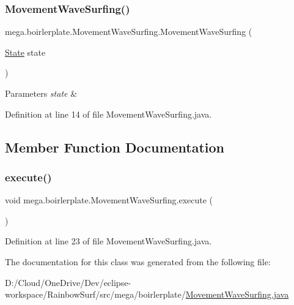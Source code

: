 \subsubsection{\texorpdfstring{Movement\+Wave\+Surfing()}{MovementWaveSurfing()}}
{\footnotesize\ttfamily mega.\+boirlerplate.\+Movement\+Wave\+Surfing.\+Movement\+Wave\+Surfing (\begin{DoxyParamCaption}\item[{\hyperlink{classmega_1_1boirlerplate_1_1_state}{State}}]{state }\end{DoxyParamCaption})}


\begin{DoxyParams}{Parameters}
{\em state} & \\
\hline
\end{DoxyParams}


Definition at line 14 of file Movement\+Wave\+Surfing.\+java.



\subsection{Member Function Documentation}
\mbox{\label{classmega_1_1boirlerplate_1_1_movement_wave_surfing_a3bc154028a2cbcfd699d8fd59bdbcc14}} 
\subsubsection{\texorpdfstring{execute()}{execute()}}
{\footnotesize\ttfamily void mega.\+boirlerplate.\+Movement\+Wave\+Surfing.\+execute (\begin{DoxyParamCaption}{ }\end{DoxyParamCaption})}



Definition at line 23 of file Movement\+Wave\+Surfing.\+java.



The documentation for this class was generated from the following file\+:\begin{DoxyCompactItemize}
\item 
D\+:/\+Cloud/\+One\+Drive/\+Dev/eclipse-\/workspace/\+Rainbow\+Surf/src/mega/boirlerplate/\hyperlink{_movement_wave_surfing_8java}{Movement\+Wave\+Surfing.\+java}\end{DoxyCompactItemize}
